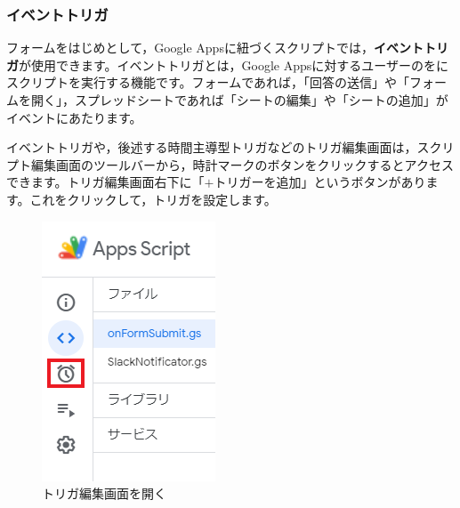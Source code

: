 \documentclass[uplatex,a4j]{jsarticle}
\begin{document}
\subsubsection{イベントトリガ}
\label{ssub:event_trigger}

フォームをはじめとして，Google Appsに紐づくスクリプトでは，\textbf{イベントトリガ}が使用できます。イベントトリガとは，Google Appsに対するユーザーのをにスクリプトを実行する機能です。フォームであれば，「回答の送信」や「フォームを開く」，スプレッドシートであれば「シートの編集」や「シートの追加」がイベントにあたります。


イベントトリガや，後述する時間主導型トリガなどのトリガ編集画面は，スクリプト編集画面のツールバーから，時計マークのボタンをクリックするとアクセスできます。トリガ編集画面右下に「$+$トリガーを追加」というボタンがあります。これをクリックして，トリガを設定します。

\begin{figure}[H]
 \centering
 \includegraphics[keepaspectratio, scale=0.7]{images/trigger_button.png}
 \caption{トリガ編集画面を開く}
 \label{fig:trigger_button}
\end{figure}
\end{document}
